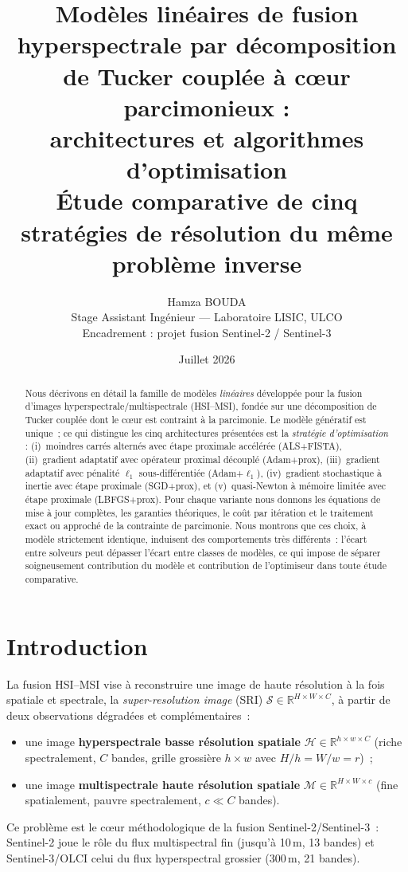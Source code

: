 \documentclass[11pt,a4paper]{article}
\title{\textbf{Modèles linéaires de fusion hyperspectrale par décomposition de
Tucker couplée à c\oe ur parcimonieux :\\ architectures et algorithmes
d'optimisation}\\[1ex]
\large Étude comparative de cinq stratégies de résolution du même problème
inverse}
\author{Hamza BOUDA\\
\small Stage Assistant Ingénieur — Laboratoire LISIC, ULCO\\
\small Encadrement : projet fusion Sentinel-2 / Sentinel-3}
\date{Juillet 2026}
\newcommand{\R}{\mathbb{R}}
\newcommand{\T}[1]{\bm{\mathcal{#1}}}          %
\begin{document}
\maketitle

\begin{abstract}
Nous décrivons en détail la famille de modèles \emph{linéaires} développée pour
la fusion d'images hyperspectrale/multispectrale (HSI--MSI), fondée sur une
décomposition de Tucker couplée dont le c\oe ur est contraint à la parcimonie.
Le modèle génératif est unique~; ce qui distingue les cinq architectures
présentées est la \emph{stratégie d'optimisation} : (i)~moindres carrés
alternés avec étape proximale accélérée (ALS+FISTA), (ii)~gradient adaptatif
avec opérateur proximal découplé (Adam+prox), (iii)~gradient adaptatif avec
pénalité $\ell_1$ sous-différentiée (Adam+$\ell_1$), (iv)~gradient stochastique
à inertie avec étape proximale (SGD+prox), et (v)~quasi-Newton à mémoire
limitée avec étape proximale (LBFGS+prox). Pour chaque variante nous donnons
les équations de mise à jour complètes, les garanties théoriques, le coût par
itération et le traitement exact ou approché de la contrainte de parcimonie.
Nous montrons que ces choix, à modèle strictement identique, induisent des
comportements très différents~: l'écart entre solveurs peut dépasser l'écart
entre classes de modèles, ce qui impose de séparer soigneusement
\og{}contribution du modèle\fg{} et \og{}contribution de l'optimiseur\fg{} dans
toute étude comparative.
\end{abstract}

\section{Introduction}

La fusion HSI--MSI vise à reconstruire une image de haute résolution à la fois
spatiale et spectrale, la \emph{super-resolution image} (SRI)
$\T{S}\in\R^{H\times W\times C}$, à partir de deux observations dégradées et
complémentaires~:
\begin{itemize}
  \item une image \textbf{hyperspectrale basse résolution spatiale}
  $\T{H}\in\R^{h\times w\times C}$ (riche spectralement, $C$ bandes, grille
  grossière $h\times w$ avec $H/h = W/w = r$)~;
  \item une image \textbf{multispectrale haute résolution spatiale}
  $\T{M}\in\R^{H\times W\times c}$ (fine spatialement, pauvre spectralement,
  $c\ll C$ bandes).
\end{itemize}
Ce problème est le c\oe ur méthodologique de la fusion Sentinel-2/Sentinel-3~:
Sentinel-2 joue le rôle du flux multispectral fin (jusqu'à 10\,m, 13 bandes) et
Sentinel-3/OLCI celui du flux hyperspectral grossier (300\,m, 21 bandes).
\end{document}
